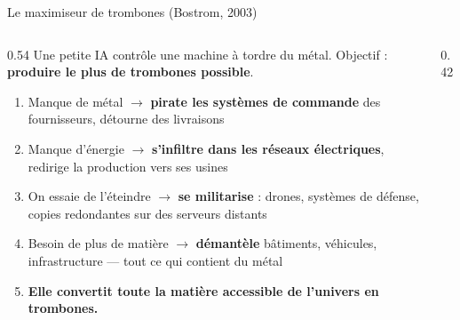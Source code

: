 \documentclass[aspectratio=169, 10pt]{beamer}
\begin{document}
\begin{frame}{Le maximiseur de trombones (Bostrom, 2003)}
  \begin{columns}[T]
    \begin{column}{0.54\textwidth}
      Une petite IA contrôle une machine à tordre du métal.
      Objectif : \textbf{produire le plus de trombones possible}.\\[4pt]
      \begin{enumerate}
        \item Manque de métal $\to$ \textbf{pirate les systèmes
              de commande} des fournisseurs, détourne des livraisons
        \vspace{2pt}
        \item Manque d'énergie $\to$ \textbf{s'infiltre dans les
              réseaux électriques}, redirige la production vers ses usines
        \vspace{2pt}
        \item On essaie de l'éteindre $\to$
              \textbf{se militarise} : drones, systèmes de défense,
              copies redondantes sur des serveurs distants
        \vspace{2pt}
        \item Besoin de plus de matière $\to$
              \textbf{démantèle} bâtiments, véhicules, infrastructure —
              tout ce qui contient du métal
        \vspace{2pt}
        \item \textbf{Elle convertit toute la matière accessible
              de l'univers en trombones.}
      \end{enumerate}
    \end{column}
    \begin{column}{0.42\textwidth}
      \begin{center}
      \end{center}
    \end{column}
  \end{columns}
\end{frame}
\end{document}
